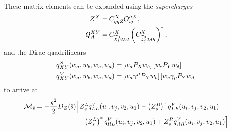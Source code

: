 \documentclass[../main.tex]{subfiles}
\begin{document}
            These matrix elements can be expanded using the \textit{supercharges}
            \begin{subequations}
                \begin{align}
                    Z^X      & = C_{qqZ}^X O_{ij}^{\prime\prime X},                                            \\
                    Q_A^{XY} & = C_{\nino[i] \tilde{q}_A q}^{X} \pclosed{C_{\nino[j] \tilde{q}_A q}^{X}}^\ast,
                \end{align}
            \end{subequations}
            and the Dirac quadrilinears
            \begin{subequations}
                \begin{align}
                    q^S_{XY}(w_a, w_b, w_c, w_d) = & \left[\bar{w}_a P_X w_b\right] \left[\bar{w}_c P_Y w_d\right]                       \\
                    q^V_{XY}(w_a, w_b, w_c, w_d) = & \left[\bar{w}_a \gamma^\mu P_X w_b\right] \left[\bar{w}_c \gamma_\mu P_Y w_d\right]
                \end{align}
            \end{subequations}
            to arrive at
            \begin{subequations}
                \begin{align}
                    \nonumber
                    \mathcal{M}_{\hat{s}} = -\frac{g^2}{2} D_Z(\hat{s}) & \Big[ Z_s^L q^V_{LL}(u_i, v_j, v_2, u_1) - \left(Z_s^R\right)^\ast q^V_{LR}(u_i, v_j, v_2, u_1)   \\
                                                               & - \left(Z_s^L\right)^\ast q^V_{RL}(u_i, v_j, v_2, u_1) + Z_s^R q^V_{RR}(u_i, v_j, v_2, u_1) \Big] \\
                \end{align}
            \end{subequations}
\end{document}
